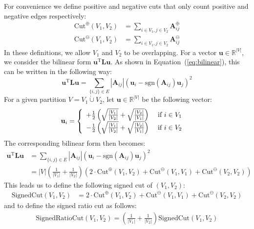 \documentclass[11pt,a4paper]{book}
\newcommand{\dunion}{\mathbin{\dot\cup}} %
\begin{document}
For convenience we define positive and negative cuts that only count
positive and negative edges respectively:
\begin{align}
  \mathrm{Cut}^\oplus(V_1,V_2) &= \sum_{i \in V_1, j \in V_2} \mathbf A^\oplus_{ij} \\
  \mathrm{Cut}^\ominus(V_1,V_2) &= \sum_{i \in V_1, j \in V_2} \mathbf A^\ominus_{ij}
\end{align}
In these definitions, we allow $V_1$ and $V_2$ to be overlapping. 
For a vector $\mathbf u\in \mathbb{R}^{|V|}$, we consider the bilinear
form $\mathbf u^{\mathrm T}
\mathbf L\mathbf u$.  As shown in Equation~(\ref{eq:bilinear}), this can be written
in the following way:
\begin{displaymath}
  \mathbf u^{\mathrm T} \mathbf L \mathbf u = \sum_{\{i,j\}\in E}
  |\mathbf A_{ij}| (\mathbf u_i - \mathrm{sgn}(\mathbf A_{ij}) \mathbf u_j)^2
\end{displaymath}
For a given partition $V = V_1 \dunion V_2$, let $\mathbf u \in \mathbb R^{|V|}$ be the following
vector:
\begin{align}
  \mathbf u_i &= \left\{ \begin{array}{ll} +\frac 1 2 \left( \sqrt
    \frac{|V_1|}{|V_2|} + \sqrt 
    \frac{|V_2|}{|V_1|} \right) & \textnormal{ if } i \in V_1 \\
    -\frac 1 2 \left( \sqrt \frac{|V_1|}{|V_2|} + \sqrt
    \frac{|V_2|}{|V_1|} \right) & \textnormal{ if } i \in V_2 
  \end{array} \right. 
  \label{eq:signed-clustering} 
\end{align}
The corresponding bilinear form then becomes: 
\begin{align*}
  \mathbf u^{\mathrm T}\mathbf L\mathbf u &= \sum_{\{i,j\}\in E}
  |\mathbf A_{ij}| \left(\mathbf u_i -
  \mathrm{sgn}(\mathbf A_{ij})\mathbf u_j\right)^2 \\
  &= |V| 
  \left(\frac 1 {|V_1|} +\frac 1 {|V_2|}\right)
  \left(2 \cdot \mathrm{Cut}^\oplus(V_1,V_2) + \mathrm{Cut}^\ominus(V_1,V_1)
  + \mathrm{Cut}^\ominus(V_2,V_2) \right) 
\end{align*}
This leads us to define the following signed cut of $(V_1,V_2)$:
\begin{align}
  \mathrm{SignedCut}(V_1,V_2) &= 2 \cdot \mathrm{Cut}^\oplus(V_1,V_2) +
  \mathrm{Cut}^\ominus(V_1,V_1)  + \mathrm{Cut}^\ominus(V_2,V_2) 
\end{align}
and to define the signed ratio cut as follows:
\begin{align}
  \mathrm{SignedRatioCut}(V_1,V_2) = 
  \left(\frac 1 {|V_1|} +\frac 1 {|V_2|}\right) 
  \mathrm{SignedCut}(V_1,V_2)
\end{align}
\end{document}
